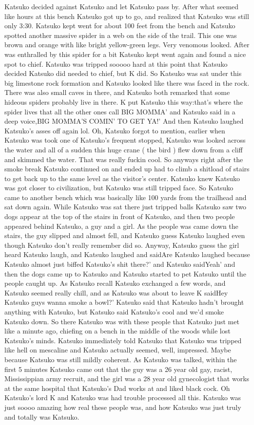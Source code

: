 \documentclass[12pt]{book}
\begin{document}
Katsuko decided against Katsuko and let Katsuko pass by. After what seemed like hours at this bench Katsuko got up to go, and realized that Katsuko was still only 3:30. Katsuko kept went for about 100 feet from the bench and Katsuko spotted another massive spider in a web on the side of the trail. This one was brown and orange with like bright yellow-green legs. Very venomous looked. After was enthralled by this spider for a bit Katsuko kept went again and found a nice spot to chief. Katsuko was tripped sooooo hard at this point that Katsuko decided Katsuko did needed to chief, but K did. So Katsuko was sat under this big limestone rock formation and Katsuko looked like there was faced in the rock. There was also small caves in there, and Katsuko both remarked that some hideous spiders probably live in there. K put Katsuko this way:that's where the spider lives that all the other ones call BIG MOMMA' and Katsuko said in a deep voice,BIG MOMMA'S COMIN' TO GET YA!' And then Katsuko laughed Katsuko's asses off again lol. Oh, Katsuko forgot to mention, earlier when Katsuko was took one of Katsuko's frequent stopped, Katsuko was looked across the water and all of a sudden this huge crane ( the bird ) flew down from a cliff and skimmed the water. That was really fuckin cool. So anyways right after the smoke break Katsuko continued on and ended up had to climb a shitload of stairs to get back up to the same level as the visitor's center. Katsuko knew Katsuko was got closer to civilization, but Katsuko was still tripped face. So Katsuko came to another bench which was basically like 100 yards from the trailhead and sat down again. While Katsuko was sat there just tripped balls Katsuko saw two dogs appear at the top of the stairs in front of Katsuko, and then two people appeared behind Katsuko, a guy and a girl. As the people was came down the stairs, the guy slipped and almost fell, and Katsuko guess Katsuko laughed even though Katsuko don't really remember did so. Anyway, Katsuko guess the girl heard Katsuko laugh, and Katsuko laughed and saidAre Katsuko laughed because Katsuko almost just biffed Katsuko's shit there?' and Katsuko saidYeah' and then the dogs came up to Katsuko and Katsuko started to pet Katsuko until the people caught up. As Katsuko recall Katsuko exchanged a few words, and Katsuko seemed really chill, and as Katsuko was about to leave K saidHey Katsuko guys wanna smoke a bowl?' Katsuko said that Katsuko hadn't brought anything with Katsuko, but Katsuko said Katsuko's cool and we'd smoke Katsuko down. So there Katsuko was with these people that Katsuko just met like a minute ago, chiefing on a bench in the middle of the woods while lost Katsuko's minds. Katsuko immediately told Katsuko that Katsuko was tripped like hell on mescaline and Katsuko actually seemed, well, impressed. Maybe because Katsuko was still mildly coherent. As Katsuko was talked, within the first 5 minutes Katsuko came out that the guy was a 26 year old gay, racist, Mississippian army recruit, and the girl was a 28 year old gynecologist that works at the same hospital that Katsuko's Dad works at and liked black cock. Oh Katsuko's lord K and Katsuko was had trouble processed all this. Katsuko was just soooo amazing how real these people was, and how Katsuko was just truly and totally was Katsuko. 
\end{document}
